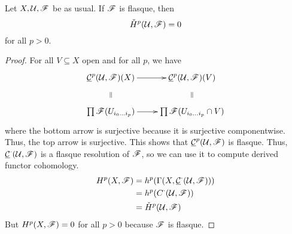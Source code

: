 \begin{lemma}
Let $X,\mathcal{U},\mathscr{F}$ be as usual.  If $\mathscr{F}$ is flasque, then
\[ \check H^p(\mathcal{U},\mathscr{F})=0 \] for all $p>0$.
\end{lemma}
\begin{proof}
For all $V\subseteq X$ open and for all $p$, we have
\[\xymatrix{
 \C^p(\U,\F)(X)\ar[r] \ar@{}[d]|{\parallel} &
 \C^p(\U,\F)(V)\ar@{}[d]|{\parallel}\\
 \prod \F(U_{i_0\dots i_p}) \ar[r] & \prod \F(U_{i_0\dots i_p}\cap
 V)
}\]where the bottom arrow is surjective because it is surjective
componentwise.  Thus, the top arrow is surjective.  This shows
that $\underline{\mathcal{C}}^p(\mathcal{U},\mathscr{F})$ is flasque.  Thus, $\underline{\mathcal{C}}^{\cdot}(\mathcal{U},\mathscr{F})$ is a
flasque resolution of $\mathscr{F}$, so we can use it to compute derived
functor cohomology.
\begin{align*}
 H^p(X,\mathscr{F}) &= h^p(\Gamma(X,\underline{\mathcal{C}}^{\cdot}(\mathcal{U},\mathscr{F})))\\
    &= h^p(C^{\cdot}(\mathcal{U},\mathscr{F}))\\
    &= \check H^p(\mathcal{U},\mathscr{F})
\end{align*}
But $H^p(X,\mathscr{F})=0$ for all $p>0$ because $\mathscr{F}$ is flasque.
\end{proof}

